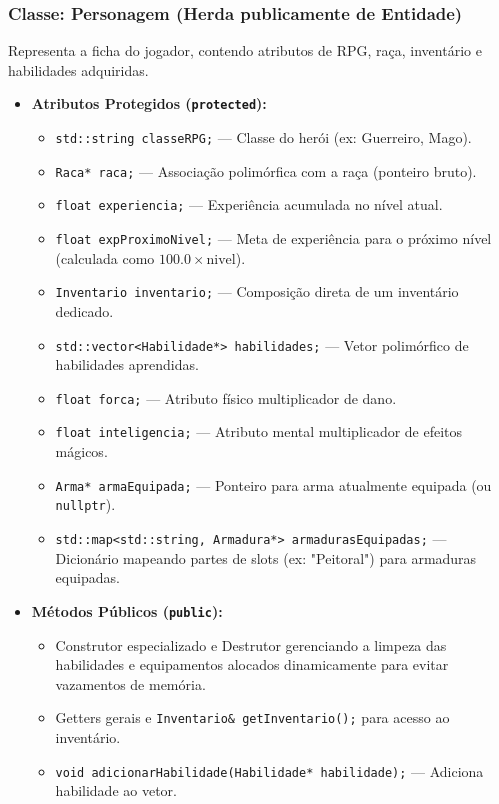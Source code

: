 \documentclass[12pt,a4paper]{article}
\begin{document}
\subsubsection{Classe: Personagem (Herda publicamente de Entidade)}
Representa a ficha do jogador, contendo atributos de RPG, raça, inventário e habilidades adquiridas.
\begin{itemize}
    \item \textbf{Atributos Protegidos (\texttt{protected}):}
    \begin{itemize}
        \item \texttt{std::string classeRPG;} --- Classe do herói (ex: Guerreiro, Mago).
        \item \texttt{Raca* raca;} --- Associação polimórfica com a raça (ponteiro bruto).
        \item \texttt{float experiencia;} --- Experiência acumulada no nível atual.
        \item \texttt{float expProximoNivel;} --- Meta de experiência para o próximo nível (calculada como $100.0 \times \text{nivel}$).
        \item \texttt{Inventario inventario;} --- Composição direta de um inventário dedicado.
        \item \texttt{std::vector<Habilidade*> habilidades;} --- Vetor polimórfico de habilidades aprendidas.
        \item \texttt{float forca;} --- Atributo físico multiplicador de dano.
        \item \texttt{float inteligencia;} --- Atributo mental multiplicador de efeitos mágicos.
        \item \texttt{Arma* armaEquipada;} --- Ponteiro para arma atualmente equipada (ou \texttt{nullptr}).
        \item \texttt{std::map<std::string, Armadura*> armadurasEquipadas;} --- Dicionário mapeando partes de slots (ex: "Peitoral") para armaduras equipadas.
    \end{itemize}
    \item \textbf{Métodos Públicos (\texttt{public}):}
    \begin{itemize}
        \item Construtor especializado e Destrutor gerenciando a limpeza das habilidades e equipamentos alocados dinamicamente para evitar vazamentos de memória.
        \item Getters gerais e \texttt{Inventario\& getInventario();} para acesso ao inventário.
        \item \texttt{void adicionarHabilidade(Habilidade* habilidade);} --- Adiciona habilidade ao vetor.

\end{itemize}
\end{itemize}
\end{document}
